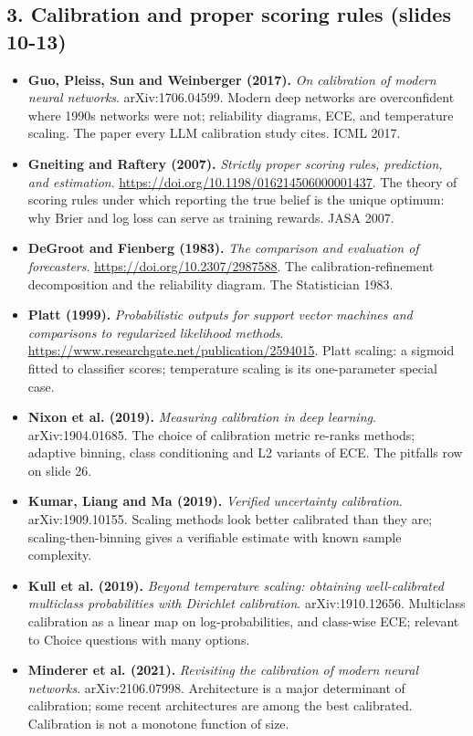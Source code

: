 \documentclass[11pt,letterpaper]{article}
\begin{document}
\subsection*{3. Calibration and proper scoring rules (slides 10-13)}
\begin{itemize}[leftmargin=1.2em,itemsep=3pt]\sloppy
\item \textbf{Guo, Pleiss, Sun and Weinberger (2017).} \textit{On calibration of modern neural networks}. arXiv:1706.04599. Modern deep networks are overconfident where 1990s networks were not; reliability diagrams, ECE, and temperature scaling. The paper every LLM calibration study cites. ICML 2017.
\item \textbf{Gneiting and Raftery (2007).} \textit{Strictly proper scoring rules, prediction, and estimation}. \url{https://doi.org/10.1198/016214506000001437}. The theory of scoring rules under which reporting the true belief is the unique optimum: why Brier and log loss can serve as training rewards. JASA 2007.
\item \textbf{DeGroot and Fienberg (1983).} \textit{The comparison and evaluation of forecasters}. \url{https://doi.org/10.2307/2987588}. The calibration-refinement decomposition and the reliability diagram. The Statistician 1983.
\item \textbf{Platt (1999).} \textit{Probabilistic outputs for support vector machines and comparisons to regularized likelihood methods}. \url{https://www.researchgate.net/publication/2594015}. Platt scaling: a sigmoid fitted to classifier scores; temperature scaling is its one-parameter special case.
\item \textbf{Nixon et al. (2019).} \textit{Measuring calibration in deep learning}. arXiv:1904.01685. The choice of calibration metric re-ranks methods; adaptive binning, class conditioning and L2 variants of ECE. The pitfalls row on slide 26.
\item \textbf{Kumar, Liang and Ma (2019).} \textit{Verified uncertainty calibration}. arXiv:1909.10155. Scaling methods look better calibrated than they are; scaling-then-binning gives a verifiable estimate with known sample complexity.
\item \textbf{Kull et al. (2019).} \textit{Beyond temperature scaling: obtaining well-calibrated multiclass probabilities with Dirichlet calibration}. arXiv:1910.12656. Multiclass calibration as a linear map on log-probabilities, and class-wise ECE; relevant to Choice questions with many options.
\item \textbf{Minderer et al. (2021).} \textit{Revisiting the calibration of modern neural networks}. arXiv:2106.07998. Architecture is a major determinant of calibration; some recent architectures are among the best calibrated. Calibration is not a monotone function of size.

\end{itemize}
\end{document}
